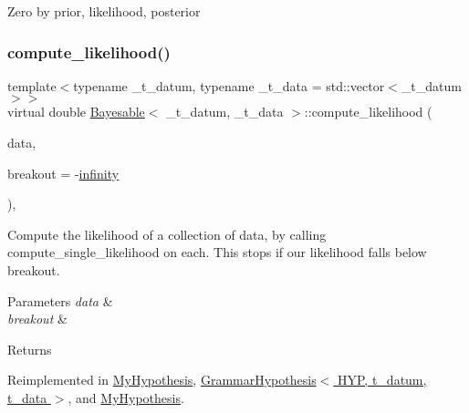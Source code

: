 Zero by prior, likelihood, posterior\mbox{\label{class_bayesable_af9547335ae15a5068b10d29aee5056ae}} 
\subsubsection{\texorpdfstring{compute\+\_\+likelihood()}{compute\_likelihood()}}
{\footnotesize\ttfamily template$<$typename \+\_\+t\+\_\+datum, typename \+\_\+t\+\_\+data = std\+::vector$<$\+\_\+t\+\_\+datum$>$$>$ \\
virtual double \hyperlink{class_bayesable}{Bayesable}$<$ \+\_\+t\+\_\+datum, \+\_\+t\+\_\+data $>$\+::compute\+\_\+likelihood (\begin{DoxyParamCaption}\item[{const \hyperlink{class_bayesable_a70a593a67c7d43239ecc06bb4fd06a6b}{t\+\_\+data} \&}]{data,  }\item[{const double}]{breakout = {\ttfamily -\/\hyperlink{_numerics_8h_a1bb1e42ae1b40cad6e99da0aab8a5576}{infinity}} }\end{DoxyParamCaption})\hspace{0.3cm}{\ttfamily [inline]}, {\ttfamily [virtual]}}



Compute the likelihood of a collection of data, by calling compute\+\_\+single\+\_\+likelihood on each. This stops if our likelihood falls below breakout. 


\begin{DoxyParams}{Parameters}
{\em data} & \\
\hline
{\em breakout} & \\
\hline
\end{DoxyParams}
\begin{DoxyReturn}{Returns}

\end{DoxyReturn}


Reimplemented in \hyperlink{class_my_hypothesis_a557264ea2caf1b983d621a112cb762c6}{My\+Hypothesis}, \hyperlink{class_grammar_hypothesis_ae565db71afc24d042450e9ed471b4908}{Grammar\+Hypothesis$<$ H\+Y\+P, t\+\_\+datum, t\+\_\+data $>$}, and \hyperlink{class_my_hypothesis_a85348639689176eaf456aaadd63cef2f}{My\+Hypothesis}.

\mbox{\label{class_bayesable_a6fb74010b3725f610f52746cc652f92a}} 
